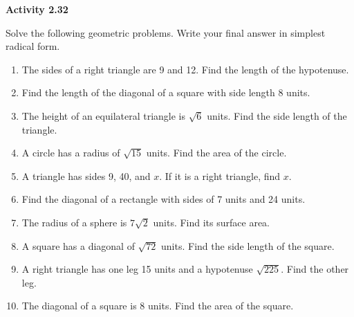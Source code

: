\vspace{0.3ex}
\noindent\textbf{Activity 2.32}

\vspace{0.2ex}

Solve the following geometric problems. Write your final answer in simplest radical form.

\begin{enumerate}[label=\color{blue}\arabic*.]

    \item The sides of a right triangle are 9 and 12. Find the length of the hypotenuse.
    \item Find the length of the diagonal of a square with side length 8 units.
    \item The height of an equilateral triangle is \( \sqrt{6} \) units. Find the side length of the triangle.
    \item A circle has a radius of \( \sqrt{15} \) units. Find the area of the circle.
    \item A triangle has sides 9, 40, and \( x \). If it is a right triangle, find \( x \).
    \item Find the diagonal of a rectangle with sides of 7 units and 24 units.
    \item The radius of a sphere is \( 7\sqrt{2} \) units. Find its surface area.
    \item A square has a diagonal of \( \sqrt{72} \) units. Find the side length of the square.
    \item A right triangle has one leg 15 units and a hypotenuse \( \sqrt{225} \). Find the other leg.
    \item The diagonal of a square is 8 units. Find the area of the square.
    
\end{enumerate}

